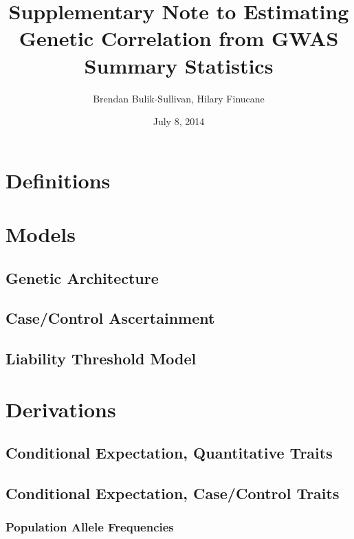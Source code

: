 \documentclass[11pt]{article}
\title{Supplementary Note to Estimating Genetic Correlation from GWAS Summary Statistics}
\author{Brendan Bulik-Sullivan, Hilary Finucane}
\date{July 8, 2014}
\begin{document}
\maketitle
\tableofcontents
\listoftables
\listoffigures
\newpage

\section{Definitions}
\label{Definitions}


\section{Models}
\subsection{Genetic Architecture}
\label{ctsmodel}


\subsection{Case/Control Ascertainment}

\subsection{Liability Threshold Model}

\section{Derivations}

\subsection{Conditional Expectation, Quantitative Traits}
\label{supp_condexp_qt}




\subsection{Conditional Expectation, Case/Control Traits}
\label{Conditional Expectation, Case/Control Traits}
\subsubsection{Population Allele Frequencies}

\end{document}
